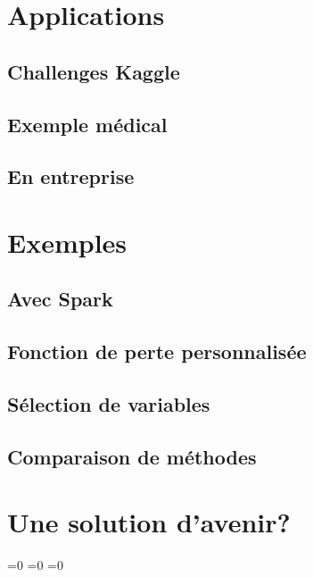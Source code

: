 \documentclass[11pt,a4paper]{article}
\begin{document}
\section{Applications}
\subsection{Challenges Kaggle}
\subsection{Exemple médical}
\subsection{En entreprise}

\section{Exemples}
\subsection{Avec Spark}
\subsection{Fonction de perte personnalisée}
\subsection{Sélection de variables}
\subsection{Comparaison de méthodes}

\section{Une solution d'avenir?}

%
%

\makeatletter
\ifnum{}=0
\clearpage
\else\ifnum{}=0
\clearpage
\else\ifnum{}=0
\clearpage
\fi\fi\fi

\renewcommand{\sectionbreak}{}
\end{document}
